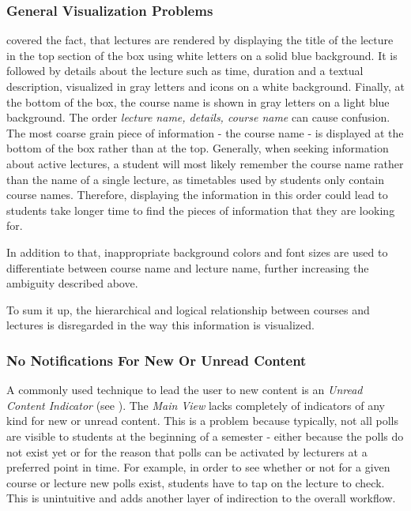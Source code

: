 \subsubsection{General Visualization Problems}
\label{section:con:problems:mainview:generalvis}  covered the fact, that lectures are rendered by displaying the title of the lecture in the top section of the box using white letters on a solid blue background. It is followed by details about the lecture such as time, duration and a textual description, visualized in gray letters and icons on a white background. Finally, at the bottom of the box, the course name is shown in gray letters on a light blue background. The order \emph{lecture name, details, course name} can cause confusion.
The most coarse grain piece of information - the course name - is displayed at the bottom of the box rather than at the top. Generally, when seeking information about active lectures, a student will most likely remember the course name rather than the name of a single lecture, as timetables used by students only contain course names. Therefore, displaying the information in this order could lead to students take longer time to find the pieces of information that they are looking for.

In addition to that, inappropriate background colors and font sizes are used to differentiate between course name and lecture name, further increasing the ambiguity described above.

To sum it up, the hierarchical and logical relationship between courses and lectures is disregarded in the way this information is visualized. 

\subsubsection{No Notifications For New Or Unread Content}
\label{section:con:problems:noindicators}
A commonly used technique to lead the user to new content is an \emph{Unread Content Indicator} (see ).
The \emph{Main View} lacks completely of indicators of any kind for new or unread content. This is a problem because typically, not all polls are visible to students at the beginning of a semester - either because the polls do not exist yet or for the reason that polls can be activated by lecturers at a preferred point in time. For example, in order to see whether or not for a given course or lecture new polls exist, students have to tap on the lecture to check. This is unintuitive and adds another layer of indirection to the overall workflow.

